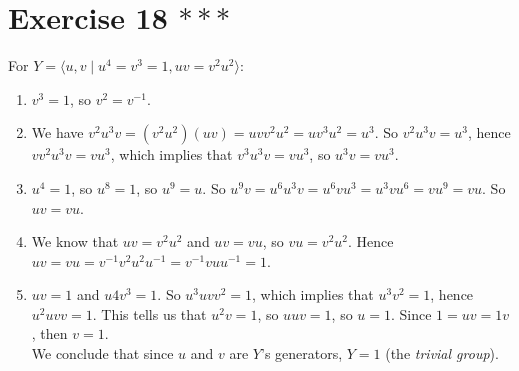 \documentclass{article}
\begin{document}
    \section*{Exercise 18 $***$}
    For $Y = \langle u, v \mid u^4 = v^3 = 1, uv = v^2u^2 \rangle$:
    \begin{enumerate}[label=\textbf{\alph*.}]
        \item 
            $v^3 = 1$, so $v^2 = v^{-1}$.
        \item 
            We have $v^2u^3v = (v^2u^2)(uv) = uvv^2u^2 = uv^3u^2 = u^3$.
            So $v^2u^3v = u^3$,
            hence $vv^2u^3v = vu^3$,
            which implies that $v^3u^3v = vu^3$,
            so $ u^3v = vu^3$.
        \item 
            $u^4 = 1$, so $u^8 = 1$, so $u^9 = u$.
            So $u^9v = u^6u^3v = u^6vu^3 = u^3vu^6 = vu^9 = vu$.
            So $uv = vu$.
        \item 
            We know that $uv = v^2u^2$ and $uv = vu$,
            so $vu = v^2u^2$.
            Hence $uv = vu = v^{-1}v^2u^2u^{-1} = v^{-1}vuu^{-1} = 1$.
        \item 
            $uv = 1$ and $u4v^3 = 1$.
            So $u^3uvv^2 = 1$,
            which implies that $u^3v^2 = 1$,
            hence $u^2uvv = 1$.
            This tells us that $u^2v = 1$,
            so $uuv = 1$,
            so $u = 1$.
            Since $1 = uv = 1v$, 
            then $v = 1$. \\
            We conclude that since $u$ and $v$ are $Y$'s generators,
            $Y = {1}$ (the \textit{trivial group}).

    \end{enumerate}   
\end{document}
